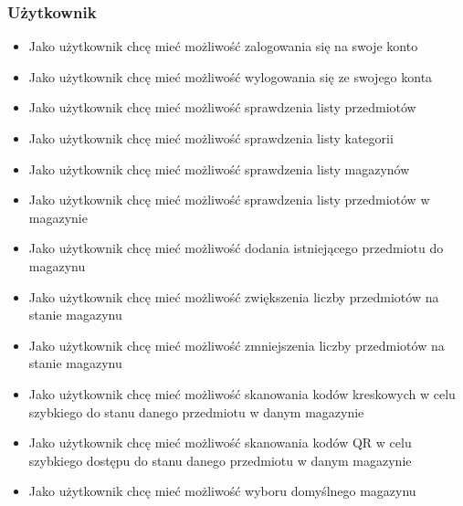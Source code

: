 \documentclass[../main.tex]{subfiles}
\begin{document}
        \subsubsection*{Użytkownik}
            \begin{itemize}
                \item Jako użytkownik chcę mieć możliwość zalogowania się na swoje konto
                \item Jako użytkownik chcę mieć możliwość wylogowania się ze swojego konta
                \item Jako użytkownik chcę mieć możliwość sprawdzenia listy przedmiotów
                \item Jako użytkownik chcę mieć możliwość sprawdzenia listy kategorii
                \item Jako użytkownik chcę mieć możliwość sprawdzenia listy magazynów
                \item Jako użytkownik chcę mieć możliwość sprawdzenia listy przedmiotów w magazynie
                \item Jako użytkownik chcę mieć możliwość dodania istniejącego przedmiotu do magazynu
                \item Jako użytkownik chcę mieć możliwość zwiększenia liczby przedmiotów na stanie magazynu
                \item Jako użytkownik chcę mieć możliwość zmniejszenia liczby przedmiotów na stanie magazynu
                \item Jako użytkownik chcę mieć możliwość skanowania kodów kreskowych w celu szybkiego do stanu danego przedmiotu w danym magazynie
                \item Jako użytkownik chcę mieć możliwość skanowania kodów QR w celu szybkiego dostępu do stanu danego przedmiotu w danym magazynie
                \item Jako użytkownik chcę mieć możliwość wyboru domyślnego magazynu
            \end{itemize}
\end{document}
